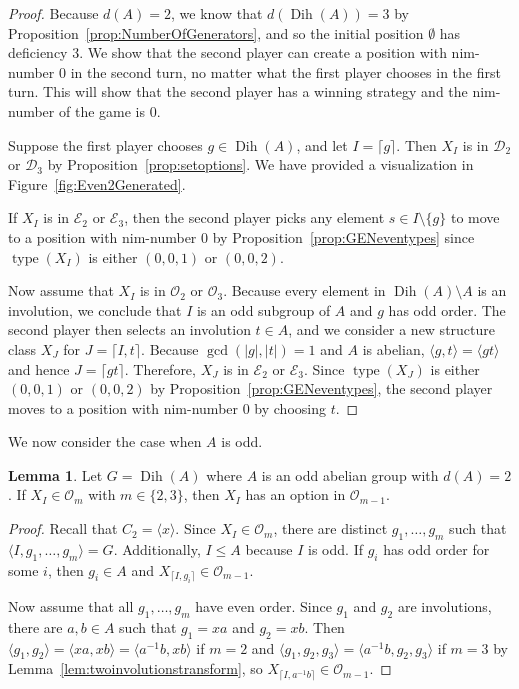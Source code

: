 \documentclass[12pt]{amsart}
\theoremstyle{definition}
\newtheorem{lemma}[equation]{Lemma}
\theoremstyle{definition}
\numberwithin{equation}{section}
\begin{document}
\begin{proof}
Because ${d}(A)=2$, we know that ${d}({\operatorname{Dih}}(A))=3$ by Proposition~\ref{prop:NumberOfGenerators}, and so the initial position $\emptyset$ has deficiency 3.
We show that the second player can create a position with nim-number 0 in the second turn, no matter what the first player chooses in the first turn. This will show that the second player has a winning strategy and
the nim-number of the game is 0. 

Suppose the first player chooses $g \in {\operatorname{Dih}}(A)$, and let $I=\lceil g \rceil$.  Then $X_I$ is in $\mathcal{D}_2$ or $\mathcal{D}_3$ by Proposition~\ref{prop:setoptions}.  
We have provided a visualization in Figure~\ref{fig:Even2Generated}.

If $X_{I}$ is in $\mathcal{E}_2$ or $\mathcal{E}_3$, then the second player picks any element $s\in I\setminus \{g\}$ to move to a position with nim-number $0$ by Proposition~\ref{prop:GENeventypes} since ${\operatorname{type}}(X_{I})$ is either $(0,0,1)$ or $(0,0,2)$.   

Now assume that $X_I$ is in $\mathcal{O}_2$ or $\mathcal{O}_3$.  Because every element in ${\operatorname{Dih}}(A)\setminus A$ is an involution, we conclude that $I$ is an odd subgroup of $A$ and $g$ has odd order.   
The second player then selects an involution $t \in A$, and we consider a new structure class $X_J$ for $J=\lceil I,t \rceil$.  
Because $\gcd(|g|,|t|)=1$ and $A$ is abelian, $\langle g,t \rangle = \langle gt \rangle$ and hence $J=\lceil gt \rceil$.  
Therefore, $X_J$ is in $\mathcal{E}_2$  or $\mathcal{E}_3$.  Since ${\operatorname{type}}(X_{J})$ is either $(0,0,1)$ or $(0,0,2)$ by Proposition~\ref{prop:GENeventypes}, the second player moves to a position with nim-number $0$ by choosing $t$.
\end{proof}

We now consider the case when $A$ is odd.

\begin{lemma}\label{lem:GENoddsmalleroddoptions}
Let $G={\operatorname{Dih}}(A)$ where $A$ is an odd abelian group with ${d}(A)=2$.  If $X_I \in \mathcal{O}_m$ with $m \in \{2,3\}$, then $X_I$ has an option in $\mathcal{O}_{m-1}$. 
\end{lemma}

\begin{proof}
Recall that $C_2=\langle x\rangle$.
Since $X_I \in \mathcal{O}_m$, there are distinct $g_1,\ldots,g_m$ such that $\langle I, g_1, \ldots, g_m \rangle = G$.  Additionally, $I \leq A$ because $I$ is odd.  
If $g_i$ has odd order for some $i$, 
then $g_i \in A$ and $X_{\lceil I, g_i \rceil} \in \mathcal{O}_{m-1}$.

Now assume that all $g_1,\ldots,g_m$ have even order.  
Since $g_1$ and $g_2$ are involutions, there are $a, b \in A$ such that $g_1=xa$ and $g_2 = xb$.  
Then $\langle g_1, g_2 \rangle = \langle xa, xb \rangle = \langle a^{-1}b, xb \rangle$ if $m=2$ and $\langle g_1,g_2,g_3 \rangle =\langle a^{-1}b,g_2,g_3\rangle$ if $m=3$ 
by Lemma~\ref{lem:twoinvolutionstransform}, so $X_{\lceil I, a^{-1}b \rceil} \in \mathcal{O}_{m-1}$.  
\end{proof}
\end{document}
